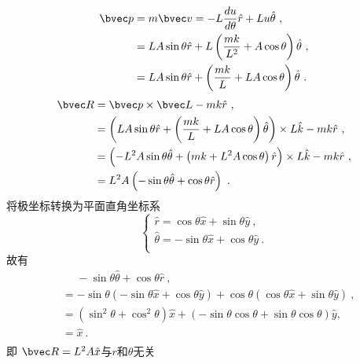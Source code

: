 \begin{align}
\bvec p &= m \bvec v = -L\frac{du}{d\theta}\hat r + Lu \hat \theta ~,\\
&=L A \sin \theta \hat r + L \left(\frac{mk}{L^{2}} + A \cos \theta \right)\hat \theta ~,\\
&=L A \sin \theta \hat r + \left(\frac{mk}{L} +L A \cos \theta \right)\hat \theta ~.\\
\end{align}
\begin{align}
\bvec R &= \bvec p \times \bvec L - mk \hat r ~,\\
&=\left(L A \sin \theta \hat r + \left(\frac{mk}{L} +L A \cos \theta \right)\hat \theta \right) \times L \hat k -mk\hat r ~,\\
&=\left(-L^{2} A \sin \theta \hat \theta + \left(mk +L^{2} A \cos \theta \right)\hat r \right) \times L \hat k -mk\hat r ~,\\
&= L^{2}A\left(-\sin \theta \hat \theta+\cos \theta \hat r \right) ~.\\
\end{align}
将极坐标转换为平面直角坐标系
\begin{equation}
\begin{cases}
\hat r = \cos \theta \hat{x} + \sin \theta \hat{y} ~,\\
\hat \theta = -\sin \theta \hat{x} +\cos \theta \hat{y} ~.\\
\end{cases}
\end{equation}
故有
\begin{align}
&\phantom{=} -\sin \theta \hat \theta+\cos \theta \hat r ~,\\
&=-\sin \theta \left(-\sin \theta \hat{x} +\cos \theta \hat{y}\right)+ \cos \theta \left(\cos \theta \hat{x} + \sin \theta \hat{y} \right)~,\\
&= \left(\sin^{2}\theta + \cos^{2}\theta\right)\hat x + \left(-\sin \theta \cos \theta +\sin \theta \cos \theta \right)\hat y ,\\
&= \hat x ~.\\
\end{align}
即 $\bvec R = L^{2}A \hat x$与$r$和$\theta$无关




